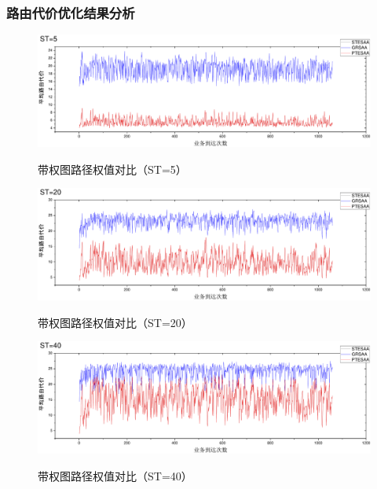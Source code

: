 \subsubsection{路由代价优化结果分析}
\begin{figure}
\setlength{\belowcaptionskip}{-0.5cm}
\begin{center}
{\includegraphics[width=1 \textwidth]{figures/H5C.pdf}}
\end{center}
\caption{{\footnotesize{带权图路径权值对比（ST=5）}}}
\label{H5C}
\end{figure}
\begin{figure}
\setlength{\belowcaptionskip}{-0.5cm}
\begin{center}
{\includegraphics[width=1 \textwidth]{figures/H20C.pdf}}
\end{center}
\caption{{\footnotesize{带权图路径权值对比（ST=20）}}}
\label{H20C}
\end{figure}
\begin{figure}
\setlength{\belowcaptionskip}{-0.5cm}
\begin{center}
{\includegraphics[width=1 \textwidth]{figures/H40C.pdf}}
\end{center}
\caption{{\footnotesize{带权图路径权值对比（ST=40）}}}
\label{H40C}
\end{figure}
